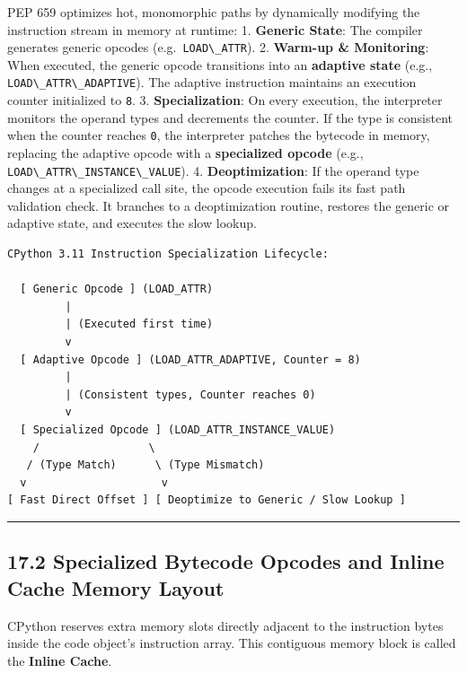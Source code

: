 PEP 659 optimizes hot, monomorphic paths by dynamically modifying the
instruction stream in memory at runtime: 1. \textbf{Generic State}: The
compiler generates generic opcodes
(e.g.~\passthrough{\lstinline!LOAD\_ATTR!}). 2. \textbf{Warm-up \&
Monitoring}: When executed, the generic opcode transitions into an
\textbf{adaptive state} (e.g.,
\passthrough{\lstinline!LOAD\_ATTR\_ADAPTIVE!}). The adaptive
instruction maintains an execution counter initialized to
\passthrough{\lstinline!8!}. 3. \textbf{Specialization}: On every
execution, the interpreter monitors the operand types and decrements the
counter. If the type is consistent when the counter reaches
\passthrough{\lstinline!0!}, the interpreter patches the bytecode in
memory, replacing the adaptive opcode with a \textbf{specialized opcode}
(e.g., \passthrough{\lstinline!LOAD\_ATTR\_INSTANCE\_VALUE!}). 4.
\textbf{Deoptimization}: If the operand type changes at a specialized
call site, the opcode execution fails its fast path validation check. It
branches to a deoptimization routine, restores the generic or adaptive
state, and executes the slow lookup.

\begin{lstlisting}
CPython 3.11 Instruction Specialization Lifecycle:

  [ Generic Opcode ] (LOAD_ATTR)
         |
         | (Executed first time)
         v
  [ Adaptive Opcode ] (LOAD_ATTR_ADAPTIVE, Counter = 8)
         |
         | (Consistent types, Counter reaches 0)
         v
  [ Specialized Opcode ] (LOAD_ATTR_INSTANCE_VALUE)
    /                 \
   / (Type Match)      \ (Type Mismatch)
  v                     v
[ Fast Direct Offset ] [ Deoptimize to Generic / Slow Lookup ]
\end{lstlisting}

\begin{center}\rule{0.5\linewidth}{0.5pt}\end{center}

\hypertarget{specialized-bytecode-opcodes-and-inline-cache-memory-layout}{%
\subsection{17.2 Specialized Bytecode Opcodes and Inline Cache Memory
Layout}\label{specialized-bytecode-opcodes-and-inline-cache-memory-layout}}

CPython reserves extra memory slots directly adjacent to the instruction
bytes inside the code object's instruction array. This contiguous memory
block is called the \textbf{Inline Cache}.

